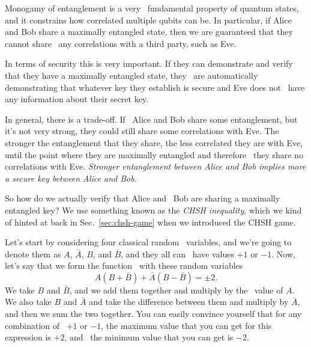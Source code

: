 Monogamy of entanglement is a very 
fundamental property of quantum states,
and it constrains how correlated
multiple qubits can be. In particular, if Alice 
and Bob share a maximally entangled state,
then we are guaranteed that they cannot share 
any correlations with a third party, such as Eve.

In terms of security this is very important.
If they can demonstrate and verify that
they have a maximally entangled state, they 
are automatically demonstrating that whatever
key they establish is secure and Eve does not 
have any information about their secret key.

In general, there is a trade-off. If 
Alice and Bob share some entanglement, but it's not very strong,
they could still share some correlations with Eve.
The stronger the entanglement that they share,
the less correlated they are with Eve, 
until the point where they
are maximally entangled and therefore 
they share no correlations with Eve.
\emph{Stronger entanglement between Alice and Bob implies more a secure key between Alice and Bob.}

So how do we actually verify that Alice and 
Bob are sharing a maximally entangled key?
We use something known as the \emph{CHSH inequality}, which we kind of hinted at back in Sec.~\ref{sec:chsh-game} when we introduced the CHSH game.

Let's start by considering four classical random 
variables, and we're going to denote them as $A$,
$\bar{A}$, $B$, and $\bar{B}$, and they all can 
have values $+1$ or $-1$.
Now, let's say that we form the function 
with these random variables
\begin{equation}
A(B+\bar{B})+\bar{A}(B-\bar{B})=\pm 2.
\end{equation}
We take $B$ and $\bar{B}$,
and we add them together and multiply by the 
value of $A$. We also take $B$ and $\bar{A}$ and take
the difference between them and multiply by $\bar{A}$, 
and then we sum the two together. You can easily
convince yourself that for any combination of 
$+1$ or $-1$, the maximum value that
you can get for this expression is $+2$, and 
the minimum value that you can get is $-2$.

